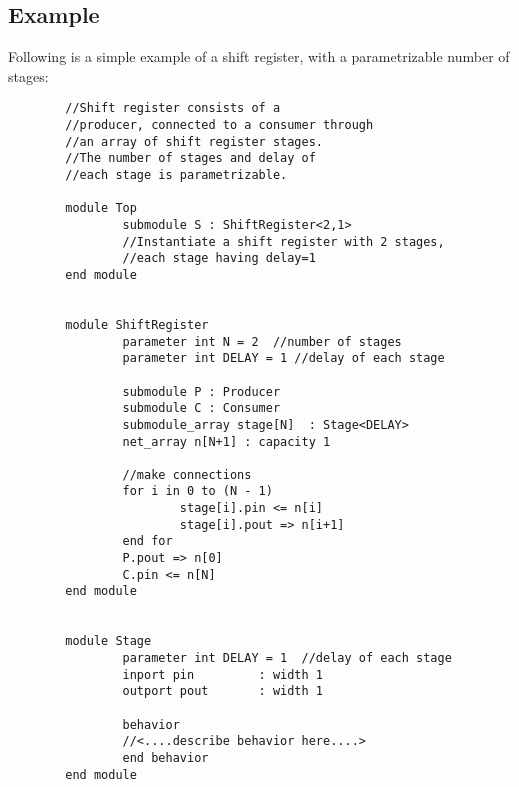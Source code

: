 	\subsection{Example}
	Following is a simple example of a shift register, with a parametrizable number of stages:
	\begin{verbatim}
        //Shift register consists of a
        //producer, connected to a consumer through 
        //an array of shift register stages.
        //The number of stages and delay of 
        //each stage is parametrizable.

        module Top
                submodule S : ShiftRegister<2,1> 
                //Instantiate a shift register with 2 stages,
                //each stage having delay=1
        end module


        module ShiftRegister 
                parameter int N = 2  //number of stages
                parameter int DELAY = 1 //delay of each stage
                
                submodule P : Producer
                submodule C : Consumer
                submodule_array stage[N]  : Stage<DELAY>
                net_array n[N+1] : capacity 1

                //make connections
                for i in 0 to (N - 1)
                        stage[i].pin <= n[i]
                        stage[i].pout => n[i+1]
                end for
                P.pout => n[0]
                C.pin <= n[N]
        end module
                        

        module Stage
                parameter int DELAY = 1  //delay of each stage
                inport pin         : width 1
                outport pout       : width 1
                
                behavior 
                //<....describe behavior here....>
                end behavior
        end module


	\end{verbatim}

